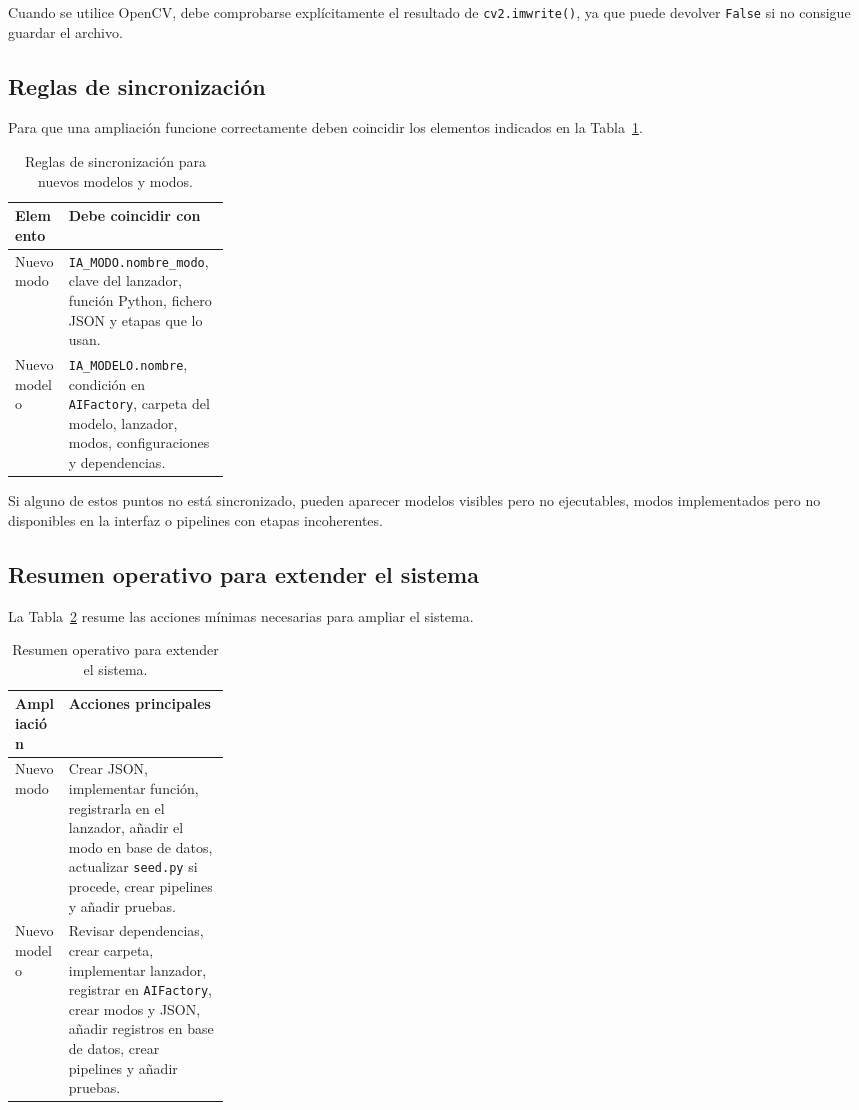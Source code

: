 Cuando se utilice OpenCV, debe comprobarse explícitamente el resultado de \texttt{cv2.imwrite()}, ya que puede devolver \texttt{False} si no consigue guardar el archivo.

\subsection{Reglas de sincronización}

Para que una ampliación funcione correctamente deben coincidir los elementos indicados en la Tabla~\ref{tabla:sincronizacion_modelos_modos}.

\begin{table}[H]
	\centering
	\small
	\renewcommand{\arraystretch}{1.15}
	\begin{tabularx}{\linewidth}{p{0.25\linewidth}X}
		\toprule
		\textbf{Elemento} & \textbf{Debe coincidir con} \\
		\midrule
		Nuevo modo & \texttt{IA\_MODO.nombre\_modo}, clave del lanzador, función Python, fichero JSON y etapas que lo usan. \\
		Nuevo modelo & \texttt{IA\_MODELO.nombre}, condición en \texttt{AIFactory}, carpeta del modelo, lanzador, modos, configuraciones y dependencias. \\
		\bottomrule
	\end{tabularx}
	\caption[Reglas de sincronización]{Reglas de sincronización para nuevos modelos y modos.}
	\label{tabla:sincronizacion_modelos_modos}
\end{table}

Si alguno de estos puntos no está sincronizado, pueden aparecer modelos visibles pero no ejecutables, modos implementados pero no disponibles en la interfaz o pipelines con etapas incoherentes.

\subsection{Resumen operativo para extender el sistema}

La Tabla~\ref{tabla:resumen_extension_sistema} resume las acciones mínimas necesarias para ampliar el sistema.

\begin{table}[H]
	\centering
	\small
	\renewcommand{\arraystretch}{1.15}
	\begin{tabularx}{\linewidth}{p{0.25\linewidth}X}
		\toprule
		\textbf{Ampliación} & \textbf{Acciones principales} \\
		\midrule
		Nuevo modo & Crear JSON, implementar función, registrarla en el lanzador, añadir el modo en base de datos, actualizar \texttt{seed.py} si procede, crear pipelines y añadir pruebas. \\
		Nuevo modelo & Revisar dependencias, crear carpeta, implementar lanzador, registrar en \texttt{AIFactory}, crear modos y JSON, añadir registros en base de datos, crear pipelines y añadir pruebas. \\
		\bottomrule
	\end{tabularx}
	\caption[Resumen de extensión del sistema]{Resumen operativo para extender el sistema.}
	\label{tabla:resumen_extension_sistema}
\end{table}

